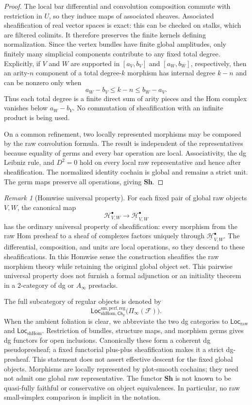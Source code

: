 \documentclass[12pt]{amsart}
\theoremstyle{definition}
\theoremstyle{remark}
\newtheorem{rem}[thm]{Remark}
\numberwithin{equation}{section}
\newcommand{\CF}{{\mathcal F}}
\newcommand{\R}{{\mathbb{R}}}
\newcommand{\1}{{\mathbb{1}}}
\newcommand{\Ch}{\mathsf{Ch}}
\newcommand{\Loc}{\mathsf{Loc}}
\begin{document}
\begin{proof}
The local bar differential and convolution composition commute with
restriction in $U$, so they induce maps of associated sheaves.
Associated sheafification of real vector spaces is exact: this can be
checked on stalks, which are filtered colimits.  It therefore preserves
the finite kernels defining normalization.  Since the vertex bundles
have finite global amplitudes, only finitely many simplicial components
contribute to any fixed total degree.  Explicitly, if $V$ and $W$ are
supported in $[a_V,b_V]$ and $[a_W,b_W]$, respectively, then an
arity-$n$ component of a total degree-$k$ morphism has internal degree
$k-n$ and can be nonzero only when
\[
 a_W-b_V\leq k-n\leq b_W-a_V.
\]
Thus each total degree is a finite direct sum of arity pieces and the
Hom complex vanishes below $a_W-b_V$.  No commutation of sheafification
with an infinite product is being used.

On a common refinement, two locally represented morphisms may be
composed by the raw convolution formula.  The result is independent of
the representatives because equality of germs and every bar operation
are local.  Associativity, the dg Leibniz rule, and $D^2=0$ hold on
every local raw representative and hence after sheafification.  The
normalized identity cochain is global and remains a strict unit.  The
germ maps preserve all operations, giving $\mathbf{Sh}$.
\end{proof}

\begin{rem}[Homwise universal property]
\label{rem:shhom-homwise-universal-property}
For each fixed pair of global raw objects $V,W$, the canonical map
\[
 \mathcal H^\bullet_{V,W}
 \longrightarrow
 \underline{\mathcal H}^\bullet_{V,W}
\]
has the ordinary universal property of sheafification: every morphism
from the raw Hom presheaf to a sheaf of complexes factors uniquely
through $\underline{\mathcal H}^\bullet_{V,W}$.  The differential,
composition, and units are local operations, so they descend to these
sheafifications.  In this Homwise sense the construction sheafifies
the raw morphism theory while retaining the original global object
set.  This pairwise universal property does not furnish a formal
adjunction or an initiality theorem in a $2$-category of dg or
$A_\infty$ prestacks.
\end{rem}

The full subcategory of regular objects is denoted by
\[
 \Loc_{\mathrm{shHom},\Ch_{\R}}^{\mathrm{sm,perf,reg}}
 \bigl(\Pi_{\infty}(\CF)\bigr).
\]
When the ambient foliation is clear, we abbreviate the two dg
categories to $\Loc_{\mathrm{raw}}$ and $\Loc_{\mathrm{shHom}}$.
Restriction of bundles, structure maps, and morphism germs gives dg
functors for open inclusions.  Canonically these form a coherent dg
pseudopresheaf; a fixed functorial plus-plus sheafification makes it a
strict dg-presheaf.  This statement does not assert effective descent
for the fixed global objects.
Morphisms are locally represented by plot-smooth cochains; they need
not admit one global raw representative.  The functor $\mathbf{Sh}$ is
not known to be quasi-fully faithful or conservative on object
equivalences.  In particular, no raw small-simplex comparison is
implicit in the notation.
\end{document}
